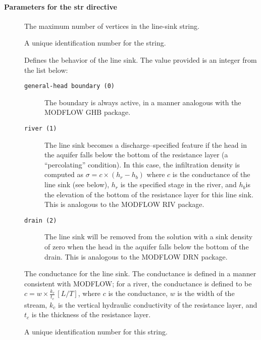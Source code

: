 \paragraph{Parameters for the \textsf{str} directive }
\begin{description}
  \item [] The maximum number of vertices in the line-sink
    string. \units{-}
  \item [] A unique identification number for the string. \units{-}
  \item [] Defines the behavior of the line sink. The value
    provided is an integer from the list below:
    \begin{description}
      \item [{\texttt{general-head boundary (0)}}] The boundary is always active,
        in a manner analogous with the MODFLOW GHB package.
      \item [{\texttt{river (1)}}] The line sink becomes a discharge--specified
        feature if the head in the aquifer falls below the bottom of the resistance
        layer (a ``percolating'' condition). In this case, the infiltration
        density is computed as $\sigma=c\times(h_{r}-h_{b})$ where $c$ is
        the conductance of the line sink (see below), $h_{r}$ is the specified
        stage in the river, and $h_{b}$is the elevation of the bottom of
        the resistance layer for this line sink. This is analogous to the
        MODFLOW RIV package.
      \item [{\texttt{drain (2)}}] The line sink will be removed from the solution
        with a sink density of zero when the head in the aquifer falls below
        the bottom of the drain. This is analogous to the MODFLOW DRN package.
    \end{description}
  \item [] The conductance for the line sink. The conductance
    is defined in a manner consistent with MODFLOW; for a river, the conductance
    is defined to be $c=w\times\frac{k_{c}}{t_{c}}\,[L/T]$, where $c$
    is the conductance, $w$ is the width of the stream, $k_{c}$ is the
    vertical hydraulic conductivity of the resistance layer, and $t_{c}$
    is the thickness of the resistance layer. 
  \item [] A unique identification number for this string.
    \units{-} 
\end{description}

